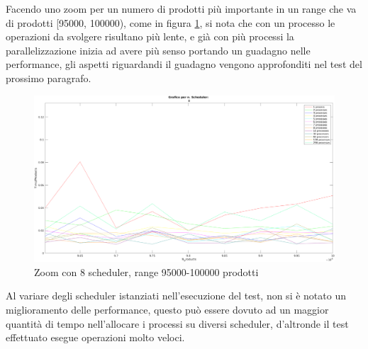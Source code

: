 Facendo uno zoom per un numero di prodotti più importante in
un range che va di prodotti [95000, 100000), come in
figura \ref{fig:zoom_8_fine}, si nota che con un processo le operazioni
da svolgere risultano più lente, e già con più processi la parallelizzazione
inizia ad avere più senso portando un guadagno nelle performance,
gli aspetti riguardandi il guadagno vengono approfonditi nel test del prossimo
paragrafo.

\begin{figure}[!htp]
    \centering
    \includegraphics[keepaspectratio=true,scale=0.33]{images/matlab/zoom_8_fine.png}
	\caption{Zoom con 8 scheduler, range 95000-100000 prodotti}
  	\label{fig:zoom_8_fine}
\end{figure}

\newpage
Al variare degli scheduler istanziati nell'esecuzione del test, non si è notato
un miglioramento delle performance, questo può essere dovuto ad un
maggior quantità di tempo nell'allocare i processi su diversi scheduler,
d'altronde il test effettuato esegue operazioni molto veloci.
	